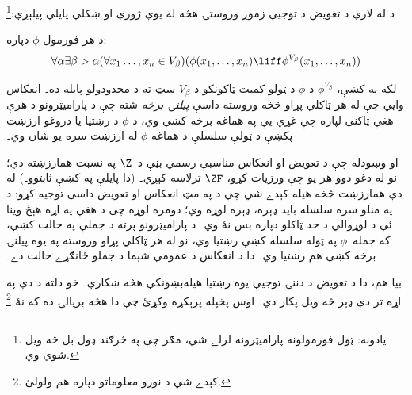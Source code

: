 \documentclass[../../../include/open-logic-section]{subfiles}
\begin{document}

د \stagesinex له لارې د تعويض د توجيې زموږ وروستۍ هڅه له يوې ژورې
او ښکلې پايلې پيلېږي:\footnote{يادونه: ټول فورمولونه پاراميټرونه
لرلے شي، مګر چې په څرګند ډول بل څه ويل شوي وي.}
\begin{thm}
د هر فورمول $\phi$ دپاره:
\[
\forall \alpha \exists \beta > \alpha (\forall x_1 \ldots, x_n \in
V_\beta)(\phi(x_1, \ldots, x_n) \liff \phi^{V_\beta}(x_1, \ldots, x_n))
\]
\end{thm}
\noindent 
لکه په  کښې،
$\phi^{V_\beta}$ د $\phi$ د ټولو کميت ټاکونکو د $V_\beta$ سټ ته
د محدودولو پايله ده۔ انعکاس وايي چې له هر ټاکلي پړاو څخه وروسته
داسې \emph{پيلنۍ برخه} شته چې د پاراميټرونو د هرې هغې ټاکنې
لپاره چې غړي يې په هماغه برخه کښې وي، د $\phi$ د رښتيا يا دروغو ارزښت پکښې د ټولې سلسلې د
هماغه $\phi$ له ارزښت سره يو شان وي۔

\citet{Montague1961} او \citet{Levy1960} وښودله چې د تعويض او
انعکاس مناسبې رسمي بڼې د~$\Z$ په نسبت همارزښته دي؛ نو له دغو دوو
هر يو چې ورزيات کړو، $\ZF$ ترلاسه کېږي۔ (دا پايلې په
 کښې ثابتوو۔) له دې
همارزښت څخه هيله کېدے شي چې د \stagesinex{} په مټ انعکاس او تعويض
داسې توجيه کړو: د \stagesinex په منلو سره سلسله بايد ډېره، ډېره
لوړه وي؛ دومره لوړه چې د هغې په اړه هېڅ وينا ئې د لوړوالي د حد
ټاکلو دپاره بس نۀ وي۔ د پاراميټرونو پرته د جملې په حالت کښې،
که جمله~$\phi$ په ټوله سلسله کښې رښتيا وي، نو له هر ټاکلي
پړاو وروسته په يوه پيلنۍ برخه کښې هم رښتيا وي۔ دا د انعکاس
د عمومي شېما د جملو ځانګړے حالت دے۔

بيا هم، دا د تعويض د دننۍ توجيې يوه رښتيا هيله‌بښونکې هڅه ښکاري۔
خو دلته د دې په اړه تر دې ډېر څه ويل پکار دي۔ اوس پخپله پرېکړه
وکړئ چې دا هڅه بريالۍ ده که نۀ۔\footnote{کېدے شي د نورو معلوماتو
دپاره \citet[95--100]{Incurvati2020} هم ولولئ.}
\end{document}

